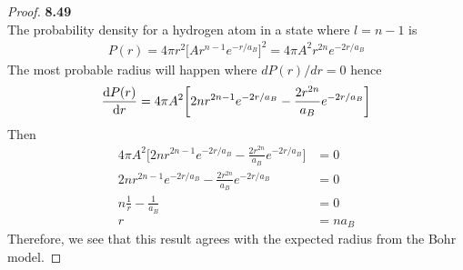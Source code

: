 \documentclass[11pt]{article}
\theoremstyle{definition}
\begin{document}
\cleardoublepage
\begin{proof}{\textbf{8.49}}\\
The probability density for a hydrogen atom in a state where $l = n - 1$ is
\begin{align*}
    P(r) = 4\pi r^2\bigg[Ar^{n-1}e^{-r/a_B}\bigg]^2
    = 4\pi A^2r^{2n}e^{-2r/a_B}
\end{align*}
The most probable radius will happen where $dP(r)/dr = 0$ hence
\begin{align*}
    \dv{P(r)}{r}
    = 4\pi A^2\bigg[2nr^{2n-1}e^{-2r/a_B} - \frac{2r^{2n}}{a_B}e^{-2r/a_B}\bigg]
\end{align*}
Then
\begin{align*}
    4\pi A^2\bigg[2nr^{2n-1}e^{-2r/a_B} - \frac{2r^{2n}}{a_B}e^{-2r/a_B}\bigg]
    &= 0\\
    2nr^{2n-1}e^{-2r/a_B} - \frac{2r^{2n}}{a_B}e^{-2r/a_B} &= 0\\
    n\frac{1}{r} - \frac{1}{a_B} &= 0\\
    r &= na_B
\end{align*}
Therefore, we see that this result agrees with the expected radius from the
Bohr model.
\end{proof}
\end{document}
